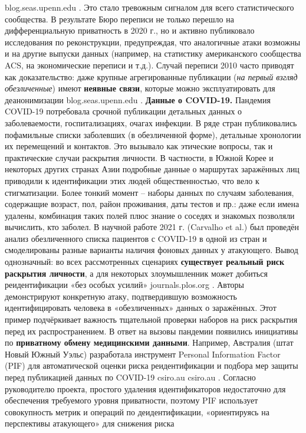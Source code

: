 blog.seas.upenn.edu
. Это стало тревожным сигналом для всего статистического сообщества. В результате Бюро переписи не только перешло на дифференциальную приватность в 2020 г., но и активно публиковало исследования по реконструкции, предупреждая, что аналогичные атаки возможны и на другие выпуски данных (например, на статистику американского сообщества ACS, на экономические переписи и т.д.). Случай переписи 2010 часто приводят как доказательство: даже крупные агрегированные публикации (\textit{на первый взгляд обезличенные}) имеют \textbf{неявные связи}, которые можно эксплуатировать для деанонимизации
blog.seas.upenn.edu
. \textbf{Данные о COVID-19.} Пандемия COVID-19 потребовала срочной публикации детальных данных о заболеваемости, госпитализациях, очагах инфекции. В ряде стран публиковались пофамильные списки заболевших (в обезличенной форме), детальные хронологии их перемещений и контактов. Это вызывало как этические вопросы, так и практические случаи раскрытия личности. В частности, в Южной Корее и некоторых других странах Азии подробные данные о маршрутах заражённых лиц приводили к идентификации этих людей общественностью, что вело к стигматизации. Более тонкий момент – наборы данных по случаям заболевания, содержащие возраст, пол, район проживания, даты тестов и пр.: даже если имена удалены, комбинация таких полей плюс знание о соседях и знакомых позволяли вычислить, кто заболел. В научной работе 2021 г. (Carvalho et al.) был проведён анализ обезличенного списка пациентов с COVID-19 в одной из стран и смоделированы разные варианты наличия фоновых данных у атакующего. Вывод однозначный: во всех рассмотренных сценариях \textbf{существует реальный риск раскрытия личности}, а для некоторых злоумышленник может добиться реидентификации «без особых усилий»
journals.plos.org
. Авторы демонстрируют конкретную атаку, подтвердившую возможность идентифицировать человека в «обезличенных» данных о заражённых. Этот пример подчёркивает важность тщательной проверки наборов на риск раскрытия перед их распространением. В ответ на вызовы пандемии появились инициативы по \textbf{приватному обмену медицинскими данными}. Например, Австралия (штат Новый Южный Уэльс) разработала инструмент Personal Information Factor (PIF) для автоматической оценки риска реидентификации и подбора мер защиты перед публикацией данных по COVID-19
csiro.au
csiro.au
. Согласно руководителю проекта, простого удаления идентификаторов недостаточно для обеспечения требуемого уровня приватности, поэтому PIF использует совокупность метрик и операций по деидентификации, «ориентируясь на перспективы атакующего» для снижения риска
